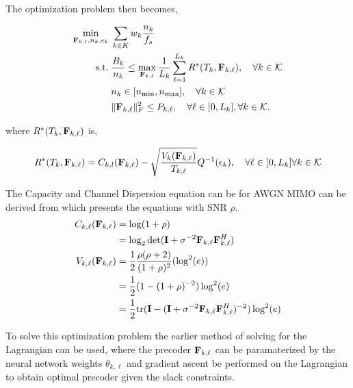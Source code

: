 \documentclass[a4paper, 12pt, onecolumn, journal, twoside, draftclsnofoot]{IEEEtran}
\begin{document}
The optimization problem then becomes, 

\begin{equation*}
	\begin{split}
		\min_{{\bf F}_{k,\ell}, n_k, \epsilon_k} \;& \sum_{k \in K} w_k \frac{n_k}{f_s} \\
		\text{s.t.}\;& \frac{B_k}{n_k} \leq \max_{{\bf F}_{k, \ell}} \frac{1}{L_k} \sum_{\ell=1}^{L_k} 		R^*(T_{k}, {\bf F}_{k, \ell}), \quad \forall k \in { \mathcal{K} } \\ 
		& n_k \in [n_{\text{min}}, n_{\text{max}}], \quad \forall k \in { \mathcal{K} } \\
		& \|{\bf F}_{k,\ell}\|_F^2 \leq P_{k,\ell}, \quad \forall \ell \in [0, L_k],  \forall k \in { \mathcal{K} }.
	\end{split}
\end{equation*}

where $R^*(T_k, {\bf F}_{k,\ell})$ is,

\begin{equation*}
	R^*(T_{k} , {\bf F}_{k,\ell}) =  C_{k,l}({\bf F}_{k,\ell}) - \sqrt{ \frac{V_k({\bf F}_{k,\ell})}{ T_{k, \ell} } } Q^{-1}  (\epsilon_k), \quad \forall \ell \in [0,L_k] \forall k \in { \mathcal{K} }\\
\end{equation*}

The Capacity and Channel Dispersion equation can be for AWGN MIMO can be derived from \cite{yuri2010} which presents the equations with SNR $\rho$.
\begin{equation*}
	\begin{aligned}
		C_{k,\ell}({\bf F}_{k,\ell}) &= \log(1+\rho) \\
		 &=\log_2\det({\bf I}+\sigma^{-2}{\bf F}_{k,\ell}{\bf F}_{k,\ell}^H) \\
		V_{k,\ell}({\bf F}_{k,\ell}) &= \frac{1}{2}\frac{\rho(\rho+2)}{(1+\rho)^2}(\log^2(e)) \\
		&= \frac{1}{2} (1-(1+\rho)^{-2})\log^2(e) \\
		&= \frac{1}{2} \text{tr}({\bf I} - ({\bf I}+\sigma^{-2}{\bf F}_{k,\ell}{\bf F}_{k,\ell}^H)^{-2})\log^2(e)
	\end{aligned}
\end{equation*}



To solve this optimization problem the earlier method of solving for the Lagrangian can be used, where the precoder ${\bf F}_{k,\ell}$ can be paramaterized by the neural network weights $\theta_{k,\ell}$ and gradient ascent be performed on the Lagrangian to obtain optimal precoder given the slack constraints.
\end{document}
